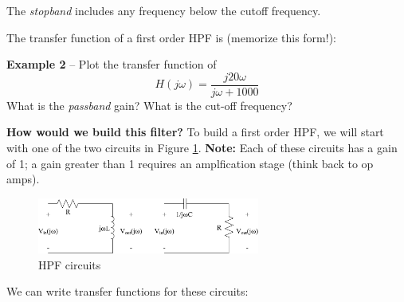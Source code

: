 \documentclass{handout}
\begin{document}
The {\em stopband} includes any frequency below the cutoff frequency.

The transfer function of a first order HPF is (memorize this form!):

\textbf{Example 2} -- Plot the transfer function of 
\[
H(j\omega) = \frac{j20\omega}{j\omega +1000}
\]
What is the {\em passband} gain? What is the cut-off frequency?

\newpage
\clearpage
\pagebreak

\textbf{How would we build this filter?}  To build a first order HPF, we will start with one of the two circuits in Figure \ref{fig: HPF}. \textbf{Note:} Each of these circuits has a gain of 1; a gain greater than 1 requires an amplfication stage (think back to op amps).
\begin{figure} [h!]
\centering
\includegraphics[width=0.65\textwidth]{HPF.jpg}
\caption{HPF circuits}
\label{fig: HPF}
\end{figure}

We can write transfer functions for these circuits:
\soln{2in}{
\[
H(j\omega) = \frac{j\omega}{j\omega +\frac{R}{L}}
\]
\[
H(j\omega) = \frac{j\omega}{j\omega +\frac{1}{RC}}
\]
}
\end{document}

